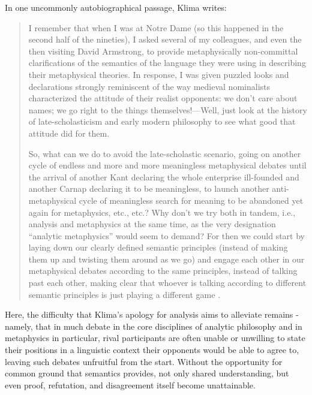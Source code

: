 \documentclass[]{article}
\begin{document}
In one uncommonly autobiographical passage, Klima writes: 
\begin{quote}
I remember that when I was at Notre Dame (so this happened in the second
half of the nineties), I asked several of my colleagues, and even the then
visiting David Armstrong, to provide metaphysically non-committal
clarifications of the semantics of the language they were using in
describing their metaphysical theories. In response, I was given puzzled
looks and declarations strongly reminiscent of the way medieval
nominalists characterized the attitude of their realist opponents: we don’t
care about names; we go right to the things themselves!—Well, just look 
at the history of late-scholasticism and early modern philosophy to see
what good that attitude did for them.

So, what can we do to avoid the late-scholastic scenario, going on another
cycle of endless and more and more meaningless metaphysical debates
until the arrival of another Kant declaring the whole enterprise ill-founded
and another Carnap declaring it to be meaningless, to launch another anti-
metaphysical cycle of meaningless search for meaning to be abandoned
yet again for metaphysics, etc., etc.? Why don’t we try both in tandem,
i.e., analysis and metaphysics at the same time, as the very designation
“analytic metaphysics” would seem to demand? For then we could start by
laying down our clearly defined semantic principles (instead of making
them up and twisting them around as we go) and engage each other in our
metaphysical debates according to the same principles, instead of talking
past each other, making clear that whoever is talking according to different
semantic principles is just playing a different game \autocite[86-87]{Klima2014}.
\end{quote}

Here, the difficulty that Klima's apology for analysis aims to alleviate remains - 
namely, that in much debate in the core disciplines of analytic philosophy  
and in metaphysics in particular, 
rival participants are often unable or unwilling to state their positions in a linguistic context their opponents would be able to agree to, 
leaving such debates unfruitful from the start. 
Without the opportunity for common ground that semantics provides, 
not only shared understanding, 
but even proof, refutation, 
and disagreement itself become unattainable.
\end{document}

